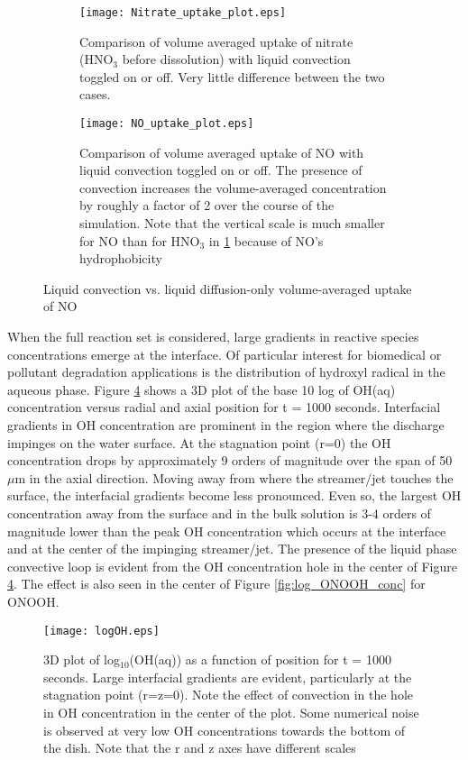 \begin{figure}[htpb]
    \centering
    \begin{subfigure}[b]{.63\textwidth}
        \texttt{[image: Nitrate\_uptake\_plot.eps]}
        \caption{Comparison of volume averaged uptake of nitrate (HNO$_3$ before dissolution) with liquid convection toggled on or off. Very little difference between the two cases.}
        \label{fig:HNO3_mass_compare}
    \end{subfigure}
    \begin{subfigure}[b]{.63\textwidth}
        \texttt{[image: NO\_uptake\_plot.eps]}
        \caption{Comparison of volume averaged uptake of NO with liquid convection toggled on or off. The presence of convection increases the volume-averaged concentration by roughly a factor of 2 over the course of the simulation. Note that the vertical scale is much smaller for NO than for HNO$_3$ in \ref{fig:HNO3_mass_compare} because of NO's hydrophobicity}
        \label{fig:NO_mass_compare}
    \end{subfigure}
    \caption{Liquid convection vs. liquid diffusion-only volume-averaged uptake of NO}
    \label{fig:excel}
\end{figure}

When the full reaction set is considered, large gradients in reactive species concentrations emerge at the interface. Of particular interest for biomedical or pollutant degradation applications is the distribution of hydroxyl radical in the aqueous phase. Figure \ref{fig:log_OH_conc} shows a 3D plot of the base 10 log of OH(aq) concentration versus radial and axial position for t = 1000 seconds. Interfacial gradients in OH concentration are prominent in the region where the discharge impinges on the water surface. At the stagnation point (r=0) the OH concentration drops by approximately 9 orders of magnitude over the span of 50 $\mu$m in the axial direction. Moving away from where the streamer/jet touches the surface, the interfacial gradients become less pronounced. Even so, the largest OH concentration away from the surface and in the bulk solution is 3-4 orders of magnitude lower than the peak OH concentration which occurs at the interface and at the center of the impinging streamer/jet. The presence of the liquid phase convective loop is evident from the OH concentration hole in the center of Figure \ref{fig:log_OH_conc}. The effect is also seen in the center of Figure \ref{fig:log_ONOOH_conc} for ONOOH.

\begin{figure}[htb]
    \centering
    \texttt{[image: logOH.eps]}
    \caption{3D plot of log$_{10}$(OH(aq)) as a function of position for t = 1000 seconds. Large interfacial gradients are evident, particularly at the stagnation point (r=z=0). Note the effect of convection in the hole in OH concentration in the center of the plot. Some numerical noise is observed at very low OH concentrations towards the bottom of the dish. Note that the r and z axes have different scales}
    \label{fig:log_OH_conc}
\end{figure}

